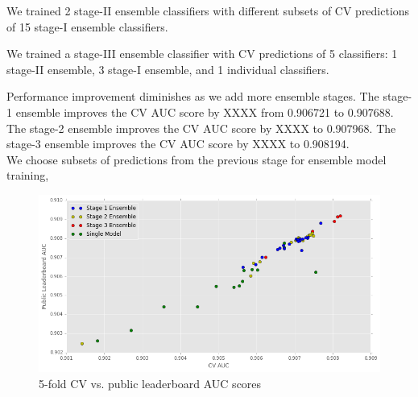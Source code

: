 We trained 2 stage-II ensemble classifiers with different subsets of CV predictions of 15 stage-I ensemble classifiers.

We trained a stage-III ensemble classifier with CV predictions of 5 classifiers: 1 stage-II ensemble, 3 stage-I ensemble, and 1 individual classifiers.

Performance improvement diminishes as we add more ensemble stages.  The stage-1 ensemble improves the CV AUC score by XXXX from 0.906721 to 0.907688.  The stage-2 ensemble improves the CV AUC score by XXXX to 0.907968.  The stage-3 ensemble improves the CV AUC score by XXXX to 0.908194.\\

We choose subsets of predictions from the previous stage for ensemble model training, 
\begin{figure}[!ht]
  \caption{5-fold CV vs. public leaderboard AUC scores}
  \centering
    \includegraphics[width=0.5 \textwidth]{cv_lb}
\end{figure}



